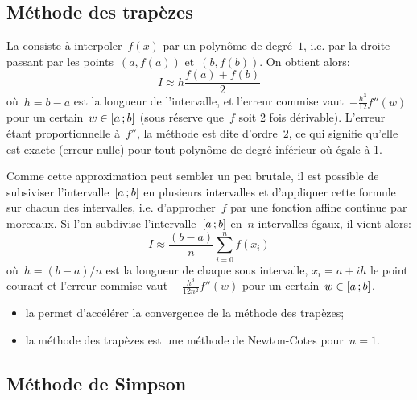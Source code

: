 \medskip
\subsection*{Méthode des trapèzes} 

La  consiste à interpoler~$f(x)$ par un polynôme de degré~$1$, i.e. par la droite passant par les points~$(a,f(a))$ et~$(b,f(b))$. On obtient alors: 
\begin{equation}
 I\approx h\dfrac{f(a)+f(b)}2
\end{equation}
où~$h=b-a$ est la longueur de l'intervalle, et l'erreur commise vaut~$-\frac{h^3}{12} f''(w)$ pour un certain~$w\in\mathopen{[}a\,;b\mathclose{]}$ (sous réserve que~$f$ soit 2 fois dérivable). L'erreur étant proportionnelle à~$f''$, la méthode est dite d'ordre~$2$, ce qui signifie qu'elle est exacte (erreur nulle) pour tout polynôme de degré inférieur où égale à 1. 

Comme cette approximation peut sembler un peu brutale, il est possible de subsiviser l'intervalle~$\mathopen{[}a\,;b\mathclose{]}$ en plusieurs intervalles et d'appliquer cette formule sur chacun des intervalles, i.e. d'approcher~$f$ par une fonction affine continue par morceaux. Si l'on subdivise l'intervalle~$\mathopen{[}a\,;b\mathclose{]}$ en~$n$ intervalles égaux, il vient alors: 
\begin{equation}
I\approx \frac{(b-a)}{n}\sum_{i=0}^{n}f(x_i)
\end{equation}
où~$h=(b-a)/n$ est la longueur de chaque sous intervalle, $x_i=a+ih$ le point courant et l'erreur commise vaut~$-\frac{h^3}{12n^2} f''(w)$ pour un certain~$w\in\mathopen{[}a\,;b\mathclose{]}$. 
\begin{remarque}[Remarques]\mbox{}
\begin{itemize}
\item la  permet d'accélérer la convergence de la méthode des trapèzes;
\item la méthode des trapèzes est une méthode de Newton-Cotes pour~$n=1$. 
\end{itemize}
\end{remarque} 

\medskip
\subsection*{Méthode de Simpson} 

